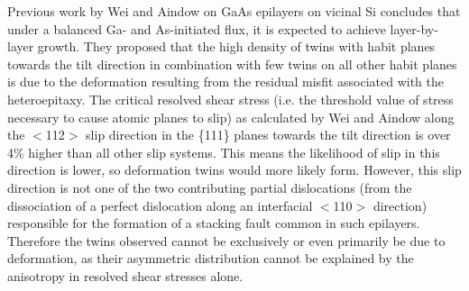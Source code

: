 Previous work by Wei and Aindow\cite{Wei1994} on GaAs epilayers on vicinal Si concludes that under a balanced Ga- and As-initiated flux, it is expected to achieve layer-by-layer growth. They proposed that the high density of twins with habit planes towards the tilt direction in combination with few twins on all other habit planes is due to the deformation resulting from the residual misfit associated with the heteroepitaxy. The critical resolved shear stress (i.e. the threshold value of stress necessary to cause atomic planes to slip) as calculated by Wei and Aindow\cite{Wei1994} along the $<$112$>$ slip direction in the \{111\} planes towards the tilt direction is over 4\% higher than all other slip systems. This means the likelihood of slip in this direction is lower, so deformation twins would more likely form. However, this slip direction is not one of the two contributing partial dislocations (from the dissociation of a perfect dislocation along an interfacial $<$110$>$ direction) responsible for the formation of a stacking fault common in such epilayers. Therefore the twins observed cannot be exclusively or even primarily be due to deformation, as their asymmetric distribution cannot be explained by the anisotropy in resolved shear stresses alone.

